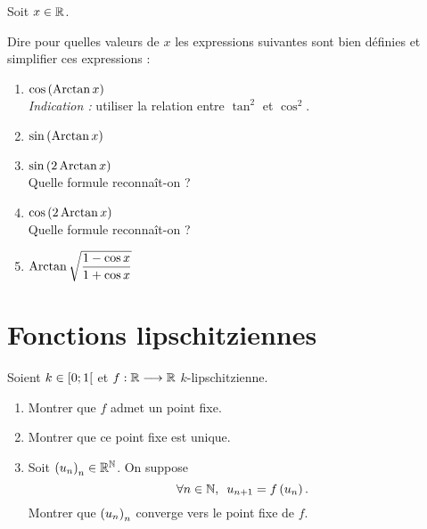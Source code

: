 \begin{exo}
Soit \(x\in\mathbb{R}\).

Dire pour quelles valeurs de \(x\) les expressions suivantes sont bien définies et simplifier ces expressions :

\begin{enumerate}
\item \(\cos\left(\operatorname{Arctan} x\right)\) \\

\textit{Indication :} utiliser la relation entre \(\tan^2\) et \(\cos^2\). \\

\item \(\sin\left(\operatorname{Arctan} x\right)\) \\

\item \(\sin\left(2\operatorname{Arctan} x\right)\) \\

Quelle formule reconnaît-on ? \\

\item \(\cos\left(2\operatorname{Arctan} x\right)\) \\

Quelle formule reconnaît-on ? \\

\item \(\operatorname{Arctan}\sqrt{\dfrac{1-\cos x}{1+\cos x}}\)
\end{enumerate}
\end{exo}

\begin{corr}
\end{corr}

\section{Fonctions lipschitziennes}

\begin{exo}
Soient \(k\in\left[0;1\right[\) et \(f:\mathbb{R}\longrightarrow\mathbb{R}\) \(k\)-lipschitzienne.

\begin{enumerate}
\item Montrer que \(f\) admet un point fixe. \\

\item Montrer que ce point fixe est unique. \\

\item Soit \(\left(u_n\right)_n\in\mathbb{R}^{\mathbb{N}}\). On suppose \[\quantifs{\forall n\in\N}u_{n+1}=f\paren{u_n}.\] Montrer que \(\left(u_n\right)_n\) converge vers le point fixe de \(f\).
\end{enumerate}
\end{exo}

